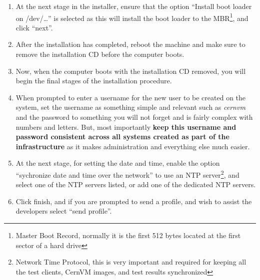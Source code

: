 \begin{enumerate}
\item	At the next stage in the installer, ensure that the option ``Install boot loader on /dev/\ldots'' is selected as this will install
		the boot loader to the MBR\footnote{Master Boot Record, normally it is the first 512 bytes located at the first sector of a hard 
		drive}, and click ``next''.
		
\item	After the installation has completed, reboot the machine and make sure to remove the installation CD before the computer boots.

\item	Now, when the computer boots with the installation CD removed, you will begin the final stages of the installation procedure.
		
\item	When prompted to enter a username for the new user to be created on the system, set the username as something simple and relevant
		such as \emph{cernvm} and the password to something you will not forget and is fairly complex with numbers and letters. But, most 
		importantly {\bf keep this username and password consistent across all systems created as part of the infrastructure} as it makes 
		administration and everything else much easier.
		
\item	At the next stage, for setting the date and time, enable the option ``sychronize date and time over the network'' to use an NTP
		server\footnote{Network Time Protocol, this is very important and required for keeping all the test clients, CernVM images,
		and test results synchronized}, and select one of the NTP servers listed, or add one of the \cern dedicated NTP servers.
		
\item	Click finish, and if you are prompted to send a profile, and wish to assist the developers select ``send profile''.
\end{enumerate}




